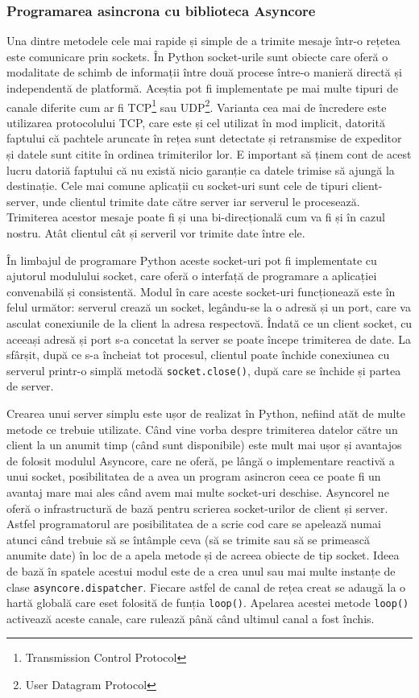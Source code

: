 \documentclass[../IoMusT.tex]{subfiles}
\begin{document}
\subsubsection{Programarea asincrona cu biblioteca Asyncore}
Una dintre metodele cele mai rapide și simple de a trimite mesaje într-o rețetea este comunicare prin sockets. În Python socket-urile sunt obiecte care oferă o modalitate de schimb de informații între două procese între-o manieră directă și independentă de platformă. Aceștia pot fi implementate pe mai multe tipuri de canale diferite cum ar fi TCP\footnote{Transmission Control Protocol} sau UDP\footnote{User Datagram Protocol}. Varianta cea mai de încredere este utilizarea protocolului TCP, care este și cel utilizat în mod implicit, datorită faptului că pachtele aruncate în rețea sunt detectate și retransmise de expeditor și datele sunt citite în ordinea trimiterilor lor. E important să ținem cont de acest lucru datoriă faptului că nu există nicio garanție ca datele trimise să ajungă la destinație. Cele mai comune aplicații cu socket-uri sunt cele de tipuri client-server, unde clientul trimite date către server iar serverul le procesează. Trimiterea acestor mesaje poate fi și una bi-direcțională cum va fi și în cazul nostru. Atât clientul cât și serveril vor trimite date între ele.
\\
\par În limbajul de programare Python aceste socket-uri pot fi implementate cu ajutorul modulului socket, care oferă o interfață de programare a aplicației convenabilă și consistentă. Modul în care aceste socket-uri funcționează este în felul următor: serverul crează un socket, legându-se la o adresă și un port, care va asculat conexiunile de la client la adresa respectovă. Îndată ce un client socket, cu aceeași adresă și port s-a concetat la server se poate începe trimiterea de date. La sfârșit, după ce s-a încheiat tot procesul, clientul poate închide conexiunea cu serverul printr-o simplă metodă \verb|socket.close()|, după care se închide și partea de server.
\\
\par Crearea unui server simplu este ușor de realizat în Python, nefiind atăt de multe metode ce trebuie utilizate. Când vine vorba despre trimiterea datelor către un client la un anumit timp (când sunt disponibile) este mult mai ușor și avantajos de folosit modulul Asyncore, care ne oferă, pe lângă o implementare reactivă a unui socket, posibilitatea de a avea un program asincron ceea ce poate fi un avantaj mare mai ales când avem mai multe socket-uri deschise. Asyncorel ne oferă o infrastructură de bază pentru scrierea socket-urilor de client și server. Astfel programatorul are posibilitatea de a scrie cod care se apelează numai atunci când trebuie să se întâmple ceva (să se trimite sau să se primească anumite date) în loc de a apela metode și de acreea obiecte de tip socket. Ideea de bază în spatele acestui modul este de a crea unul sau mai multe instanțe de clase \verb|asyncore.dispatcher|. Fiecare astfel de canal de rețea creat se adaugă la o hartă globală care eset folosită de funția \verb|loop()|. Apelarea acestei metode \verb|loop()| activează aceste canale, care rulează până când ultimul canal a fost închis.
\end{document}
